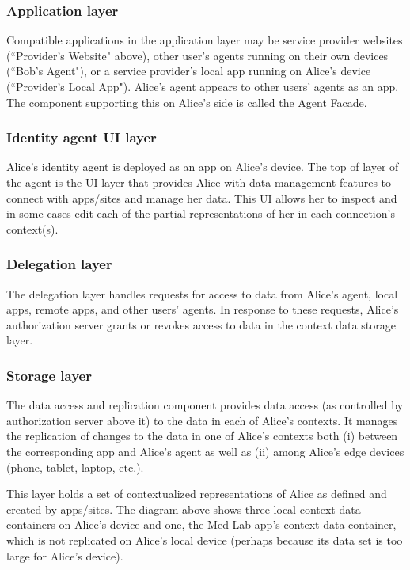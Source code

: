 \documentclass[11pt, oneside]{article}   	%
\begin{document}
\subsubsection{Application layer}

Compatible applications in the application layer may be service provider websites (``Provider's Website" above), other user's agents running on their own devices (``Bob's Agent"), or a service provider's local app running on Alice's device (``Provider's Local App"). Alice's agent appears to other users' agents as an app. The component supporting this on Alice's side is called the Agent Facade.

\subsubsection{Identity agent UI layer}

Alice's identity agent is deployed as an app on Alice's device. The top of layer of the agent is the UI layer that provides Alice with data management features to connect with apps/sites and manage her data. This UI allows her to inspect and in some cases edit each of the partial representations of her in each connection's context(s). 

\subsubsection{Delegation layer}

The delegation layer handles requests for access to data from Alice's agent, local apps, remote apps, and other users' agents. In response to these requests, Alice's authorization server grants or revokes access to data in the context data storage layer. 

\subsubsection{Storage layer}

The data access and replication component provides data access (as controlled by authorization server above it) to the data in each of Alice's contexts. It manages the replication of changes to the data in one of Alice's contexts both (i) between the corresponding app and Alice's agent as well as (ii) among Alice's edge devices (phone, tablet, laptop, etc.).

This layer holds a set of contextualized representations of Alice as defined and created by apps/sites. The diagram above shows three local context data containers on Alice's device and one, the Med Lab app's context data container, which is not replicated on Alice's local device (perhaps because its data set is too large for Alice's device).
\end{document}
